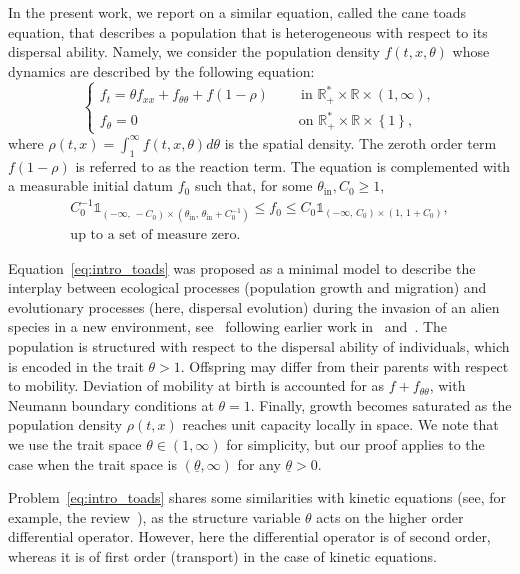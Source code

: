 \documentclass[10pt]{amsart}
\theoremstyle{definition}\newtheorem{defi}[theo]{Definition}\newtheorem{rema}[theo]{Remark}\newtheorem{exam}[theo]{Example}\newtheorem{exem}[theo]{Example}\newtheorem{nota}[theo]{Notation}
\newcommand{\rmin}{\mathrm{in}}
\newcommand{\R}{\mathbb{R}}
\newcommand{\1}{\mathds{1}}
\begin{document}
In the present work, we report on a similar equation, called the cane toads equation, that describes a population that is heterogeneous with respect to its dispersal ability. Namely, we consider the population density $f(t,x,\theta)$ whose dynamics are described by the following equation:
\begin{equation}\label{eq:intro_toads}
\begin{cases}
f_t = \theta f_{xx} + f_{\theta\theta} + f(1-\rho) \quad &\,\text{ in } \R_+^* \times \R \times (1,\infty),\\%
f_\theta = 0 & \text{ on } \R_+^*\times \R\times \left\{1\right\},
\end{cases}
\end{equation}
where $\rho(t,x) = \int_{1}^\infty f(t,x,\theta) d\theta$ is the spatial density. The zeroth order term $f(1-\rho)$ is referred to as the reaction term. The equation is complemented with a measurable initial datum $f_0$ such that, for some $\theta_{\rmin}, C_0\geq 1$,
\begin{multline}\label{eq:initial_data}
C_0^{-1}\1_{\left(-\infty,\, - C_0\right) \times \left(\theta_{\rmin},\,\theta_{\rmin} + C_0^{-1}\right)}
\leq f_0
\leq C_0 \1_{\left(-\infty,\,C_0\right) \times \left(1,\,1 + C_0\right)},\\
\text{up to a set of measure zero}.
\end{multline}

Equation~\eqref{eq:intro_toads} was proposed as a minimal model to describe the interplay between ecological processes (population growth and migration) and evolutionary processes (here, dispersal evolution) during the invasion of an alien species in a new environment, see~\cite{BenichouEtAl} following earlier work in~\cite{ChampagnatMeleard} and~\cite{ArnoldDesvillettesPrevost}. The population is structured with respect to the dispersal ability of individuals, which is encoded in the trait $\theta>1$. Offspring may differ from their parents with respect to mobility. Deviation of mobility at birth is accounted for as $f + f_{\theta\theta}$, with Neumann boundary conditions at $\theta = 1$. Finally, growth becomes saturated as the population density $\rho(t,x)$ reaches unit capacity locally in space. We note that we use the trait space $\theta \in (1,\infty)$ for simplicity, but our proof applies to the case when the trait space is $(\underline\theta, \infty)$ for any $\underline\theta>0$.


Problem~\eqref{eq:intro_toads} shares some similarities with kinetic equations (see, for example, the review~\cite{Villani}), as the structure variable $\theta$ acts on the higher order differential operator. However, here the differential operator is of second order, whereas it is of first order (transport) in the case of kinetic equations.
\end{document}
